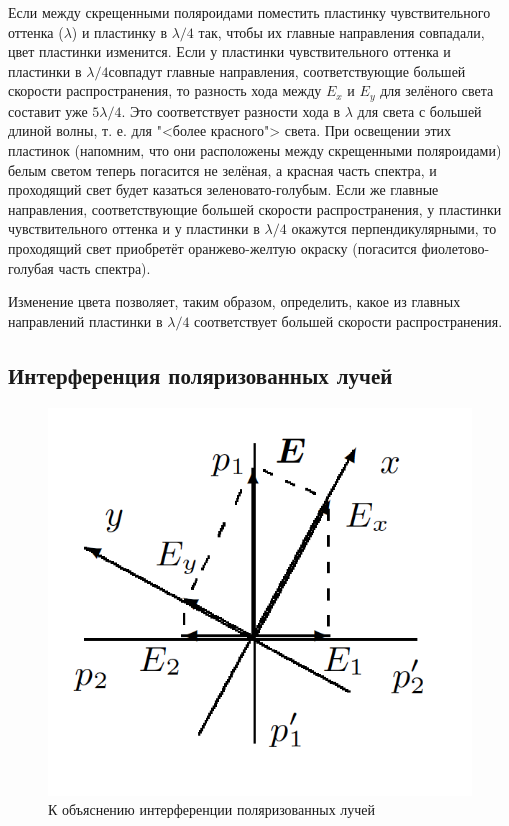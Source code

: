 \documentclass[a4paper, 12pt]{article}
\begin{document}
Если между скрещенными поляроидами поместить пластинку чувствительного оттенка
($ \lambda $) и пластинку в $ \lambda/4 $ так, чтобы их главные
направления совпадали, цвет пластинки изменится. Если у пластинки чувствительного оттенка и пластинки в $ \lambda/4  $совпадут главные направления, соответствующие большей скорости распространения, то разность хода между $ E_x $ и $ E_y $ для зелёного света составит уже $ 5\lambda/4 $. Это соответствует разности хода в $ \lambda $ для света с большей длиной волны, т. е. для "<более красного"> света. При освещении
этих пластинок (напомним, что они расположены между скрещенными поляроидами) белым светом теперь погасится не зелёная, а красная
часть спектра, и проходящий свет будет казаться зеленовато-голубым.
Если же главные направления, соответствующие большей скорости распространения, у пластинки чувствительного оттенка и у пластинки
в $ \lambda/4 $ окажутся перпендикулярными, то проходящий свет приобретёт
оранжево-желтую окраску (погасится фиолетово-голубая часть спектра).

Изменение цвета позволяет, таким образом, определить, какое из
главных направлений пластинки в $ \lambda/4 $ соответствует большей скорости
распространения.

\subsection{Интерференция поляризованных лучей}

\begin{figure}
	\includegraphics[width=\linewidth]{4}
	\caption{К объяснению интерференции
поляризованных лучей}
	\label{ris 4}
\end{figure}
\end{document}
